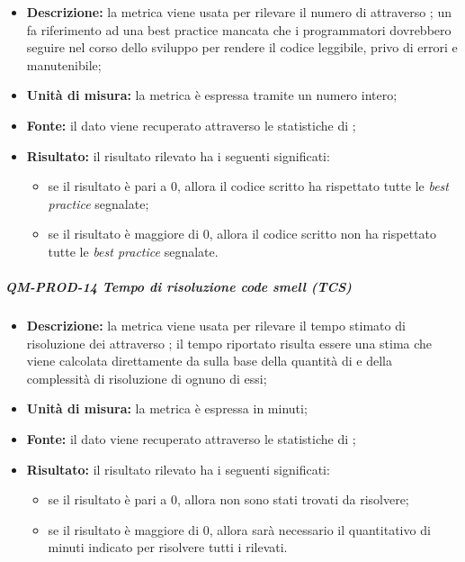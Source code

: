 			\begin{itemize}
      			\item \textbf{Descrizione: }
					la metrica viene usata per rilevare il numero di  attraverso ; un  fa riferimento ad una best practice mancata che i programmatori dovrebbero seguire nel corso dello sviluppo per rendere il codice leggibile, privo di errori e manutenibile;
				\item \textbf{Unità di misura: }
					la metrica è espressa tramite un numero intero;
				\item \textbf{Fonte: }
					il dato viene recuperato attraverso le statistiche di ;
				\item \textbf{Risultato: }
					il risultato rilevato ha i seguenti significati:
					\begin{itemize}
						\item se il risultato è pari a 0, allora il codice scritto ha rispettato tutte le \textit{best practice} segnalate;
						\item se il risultato è maggiore di 0, allora il codice scritto non ha rispettato tutte le \textit{best practice} segnalate.
					\end{itemize}
			\end{itemize}
			\subparagraph{QM-PROD-14 Tempo di risoluzione code smell (TCS)}
			\begin{itemize}
      			\item \textbf{Descrizione: }
					la metrica viene usata per rilevare il tempo stimato di risoluzione dei  attraverso ; il tempo riportato risulta essere una stima che viene calcolata direttamente da  sulla base della quantità di  e della complessità di risoluzione di ognuno di essi;
				\item \textbf{Unità di misura: }
					la metrica è espressa in minuti;
				\item \textbf{Fonte: }
					il dato viene recuperato attraverso le statistiche di ;
				\item \textbf{Risultato: }
					il risultato rilevato ha i seguenti significati:
					\begin{itemize}
						\item se il risultato è pari a 0, allora non sono stati trovati  da risolvere;
						\item se il risultato è maggiore di 0, allora sarà necessario il quantitativo di minuti indicato per risolvere tutti i  rilevati.
					\end{itemize}
			\end{itemize}
